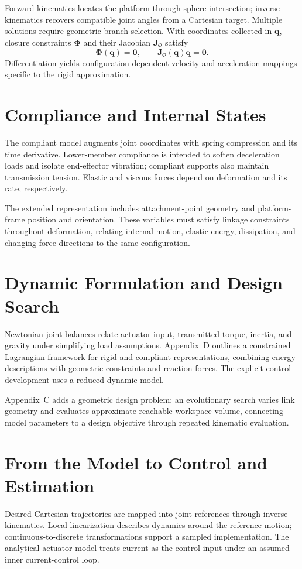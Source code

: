 Forward kinematics locates the platform through sphere intersection; inverse
kinematics recovers compatible joint angles from a Cartesian target.
Multiple solutions require geometric branch selection. With coordinates
collected in $\mathbf q$, closure constraints $\boldsymbol\Phi$ and their
Jacobian $\mathbf J_\Phi$ satisfy
\begin{equation}
\boldsymbol\Phi(\mathbf q)=\mathbf 0,\qquad
\mathbf J_{\Phi}(\mathbf q)\dot{\mathbf q}=\mathbf 0.
\end{equation}
Differentiation yields configuration-dependent velocity and acceleration
mappings specific to the rigid approximation.

\section{Compliance and Internal States}
The compliant model augments joint coordinates with spring compression
and its time derivative. Lower-member compliance is intended
to soften deceleration loads and isolate end-effector vibration;
compliant supports also maintain transmission tension. Elastic and
viscous forces depend on deformation and its rate, respectively.

The extended representation includes attachment-point geometry and
platform-frame position and orientation. These variables must satisfy
linkage constraints throughout deformation, relating internal motion,
elastic energy, dissipation, and changing force directions to the same
configuration.

\section{Dynamic Formulation and Design Search}
Newtonian joint balances relate actuator input, transmitted torque,
inertia, and gravity under simplifying load assumptions. Appendix~D
outlines a constrained Lagrangian framework for rigid and compliant
representations, combining energy descriptions with geometric
constraints and reaction forces. The explicit control development uses
a reduced dynamic model.

Appendix~C adds a geometric design problem: an evolutionary search varies
link geometry and evaluates approximate reachable workspace volume,
connecting model parameters to a design objective through repeated
kinematic evaluation.

\section{From the Model to Control and Estimation}
Desired Cartesian trajectories are mapped into joint references through
inverse kinematics. Local linearization describes dynamics around the
reference motion; continuous-to-discrete
transformations support a sampled implementation. The analytical
actuator model treats current as the control input under an assumed
inner current-control loop.

